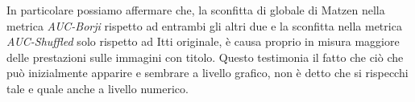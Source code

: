 \documentclass[%
	corpo=12pt,
    twoside,
    stile=classica,
    oldstyle,
    tipotesi=custom,
    greek,
    evenboxes,
]{toptesi}
\begin{document}
{%
%

In particolare possiamo affermare che, la sconfitta di globale di Matzen nella metrica \textit{AUC-Borji} rispetto ad entrambi gli altri due e la sconfitta nella metrica \textit{AUC-Shuffled} solo rispetto ad Itti originale, è causa proprio in misura maggiore delle prestazioni sulle immagini con titolo. Questo testimonia il fatto che ciò che può inizialmente apparire e sembrare a livello grafico, non è detto che si rispecchi tale e quale anche a livello numerico.

}
\end{document}
